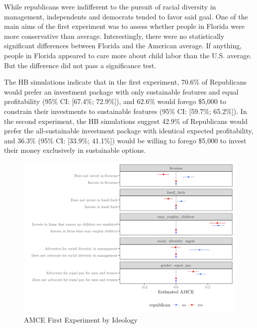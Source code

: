 \documentclass[
  12pt,
]{article}
\begin{document}
While republicans were indifferent to the pursuit of racial diversity in management, independents and democrats tended to favor said goal. One of the main aims of the first experiment was to assess whether people in Florida were more conservative than average. Interestingly, there were no statistically significant differences between Florida and the American average. If anything, people in Florida appeared to care more about child labor than the U.S. average. But the difference did not pass a significance test.

The HB simulations indicate that in the first experiment, 70.6\% of Republicans would prefer an investment package with only sustainable features and equal profitability (95\% CI: {[}67.4\%; 72.9\%{]}), and 62.6\% would forego \$5,000 to constrain their investments to sustainable features (95\% CI: {[}59.7\%; 65.2\%{]}). In the second experiment, the HB simulations suggest 42.9\% of Republicans would prefer the all-sustainable investment package with identical expected profitability, and 36.3\% (95\% CI: {[}33.9\%; 41.1\%{]}) would be willing to forego \$5,000 to invest their money exclusively in sustainable options.

\begin{figure}

{\centering \includegraphics{amce_byr_shorter} 

}

\caption{AMCE First Experiment by Ideology}\label{fig:amce1byr}
\end{figure}
\end{document}
